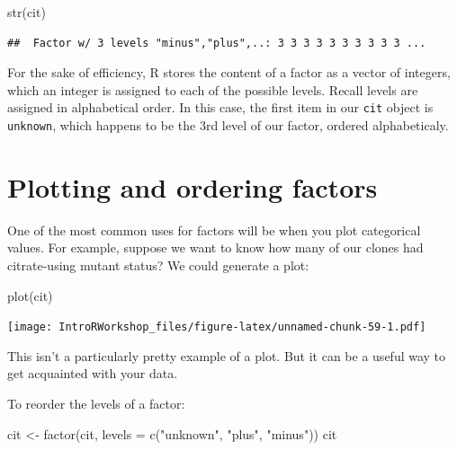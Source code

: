 \documentclass[
]{book}
\newenvironment{Shaded}{\begin{snugshade}}{\end{snugshade}}
\newcommand{\AttributeTok}[1]{\textcolor[rgb]{0.77,0.63,0.00}{#1}}
\newcommand{\FunctionTok}[1]{\textcolor[rgb]{0.00,0.00,0.00}{#1}}
\newcommand{\NormalTok}[1]{#1}
\newcommand{\OtherTok}[1]{\textcolor[rgb]{0.56,0.35,0.01}{#1}}
\newcommand{\StringTok}[1]{\textcolor[rgb]{0.31,0.60,0.02}{#1}}
\begin{document}
\begin{Shaded}
\begin{Highlighting}[]
\FunctionTok{str}\NormalTok{(cit)}
\end{Highlighting}
\end{Shaded}

\begin{verbatim}
##  Factor w/ 3 levels "minus","plus",..: 3 3 3 3 3 3 3 3 3 3 ...
\end{verbatim}

For the sake of efficiency, R stores the content of a factor as a vector of integers, which an integer is assigned to each of the possible levels. Recall levels are assigned in alphabetical order. In this case, the first item in our \texttt{cit} object is \texttt{unknown}, which happens to be the 3rd level of our factor, ordered alphabeticaly.

\hypertarget{plotting-and-ordering-factors}{%
\section{Plotting and ordering factors}\label{plotting-and-ordering-factors}}

One of the most common uses for factors will be when you plot categorical values. For example, suppose we want to know how many of our clones had citrate-using mutant status? We could generate a plot:

\begin{Shaded}
\begin{Highlighting}[]
\FunctionTok{plot}\NormalTok{(cit)}
\end{Highlighting}
\end{Shaded}

\texttt{[image: IntroRWorkshop\_files/figure-latex/unnamed-chunk-59-1.pdf]}

This isn't a particularly pretty example of a plot. But it can be a useful way to get acquainted with your data.

To reorder the levels of a factor:

\begin{Shaded}
\begin{Highlighting}[]
\NormalTok{cit }\OtherTok{\textless{}{-}} \FunctionTok{factor}\NormalTok{(cit, }\AttributeTok{levels =} \FunctionTok{c}\NormalTok{(}\StringTok{"unknown"}\NormalTok{, }\StringTok{"plus"}\NormalTok{, }\StringTok{"minus"}\NormalTok{))}
\NormalTok{cit}
\end{Highlighting}
\end{Shaded}
\end{document}
